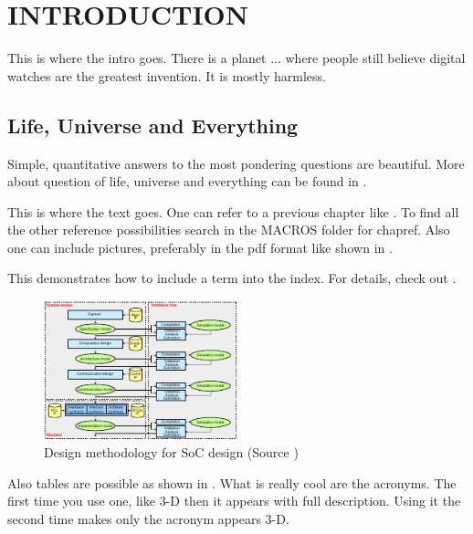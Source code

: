 
\chapter{INTRODUCTION} %
\label{chap:intro}
This is where the intro goes. 
There is a planet ... where people still believe digital watches are the 
greatest invention. It is mostly harmless. 

\section{Life, Universe and Everything}
\label{chap:intro:design}

Simple, quantitative answers to the most pondering questions are beautiful. More about question of life, universe and everything can be found in \cite{book:42}.

This is where the text goes. One can refer to a previous chapter like . To find all the other reference possibilities search in the MACROS folder for chapref. Also one can include pictures, preferably in the pdf format like shown in .

This demonstrates how to include a term into the index. For details, check out \cite{latex:index}.

\begin{figure}[htbp]
  \centering
    \includegraphics[width=0.5\textwidth]{fig/meth.pdf}
  \caption[Design methodology for SoC design]{\label{fig:intro:meth} Design methodology for SoC design (Source \cite{book:SpecC:yellow})}
\end{figure}

Also tables are possible as shown in . What is really cool are the acronyms. The first time you use one, like \ac{3-D} then it appears with full description. Using it the second time makes only the acronym appears \ac{3-D}.

